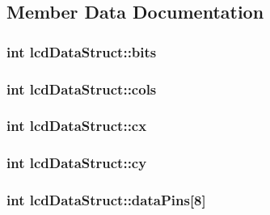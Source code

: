 \subsection{Member Data Documentation}
\hypertarget{structlcdDataStruct_aa3cd6661697d7f9d75732c819ee773bb}{
\subsubsection[{bits}]{\setlength{\rightskip}{0pt plus 5cm}int lcd\-Data\-Struct\-::bits}}\label{structlcdDataStruct_aa3cd6661697d7f9d75732c819ee773bb}
\hypertarget{structlcdDataStruct_a986c0457ecdfb118a9f39c006c818f3a}{
\subsubsection[{cols}]{\setlength{\rightskip}{0pt plus 5cm}int lcd\-Data\-Struct\-::cols}}\label{structlcdDataStruct_a986c0457ecdfb118a9f39c006c818f3a}
\hypertarget{structlcdDataStruct_a00ba0d615907c96f0bd148c5779d392f}{
\subsubsection[{cx}]{\setlength{\rightskip}{0pt plus 5cm}int lcd\-Data\-Struct\-::cx}}\label{structlcdDataStruct_a00ba0d615907c96f0bd148c5779d392f}
\hypertarget{structlcdDataStruct_a2c6cca066a0a437b01ec898c5e27be04}{
\subsubsection[{cy}]{\setlength{\rightskip}{0pt plus 5cm}int lcd\-Data\-Struct\-::cy}}\label{structlcdDataStruct_a2c6cca066a0a437b01ec898c5e27be04}
\hypertarget{structlcdDataStruct_a7e2343472b0b4d6449fef5adbeecad08}{
\subsubsection[{data\-Pins}]{\setlength{\rightskip}{0pt plus 5cm}int lcd\-Data\-Struct\-::data\-Pins\mbox{[}8\mbox{]}}}\label{structlcdDataStruct_a7e2343472b0b4d6449fef5adbeecad08}
